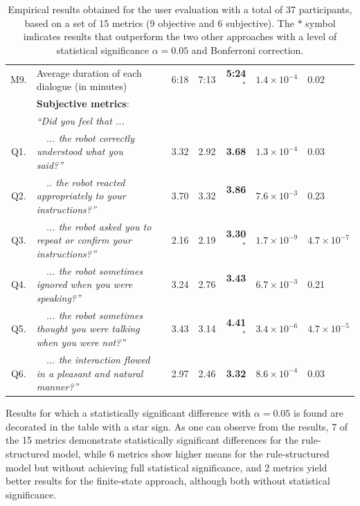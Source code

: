 \begin{table}
\begin{tabular}{|cp{110mm}c|r:r:r|p{16mm}|p{16mm}|}
M9.& Average duration of each dialogue  (in minutes) \vspace{3mm} && 6:18 & 7:13 &\textbf{ 5:24}$^{\mathbf{*}}$ & $1.4\!\times\!10^{-4}$ & 0.02 \\ \hdashline
& \vspace{-2mm} \textbf{Subjective metrics}:  && & & & & \\ 
&\textit{``Did you feel that ...}  && & & & & \\ 
Q1.&\ \ \textit{... the robot correctly understood what you said?''}  && 3.32 & 2.92 &  \textbf{3.68} & $1.3\!\times\!10^{-4}$ & 0.03 \\
Q2.& \ \ \textit{.. the robot reacted appropriately to your instructions?''}   && 3.70 & 3.32 & \textbf{3.86}$^{\phantom{*}}$ & $7.6\!\times\!10^{-3}$ & 0.23 \\
Q3.&\ \ \textit{... the robot asked you to repeat or confirm your instructions?''}   & & 2.16 & 2.19 & \textbf{3.30}$^{\mathbf{*}}$ & $1.7\!\times\!10^{-9}$ & $4.7\!\times\!10^{-7}$ \\
Q4.&\ \ \textit{... the robot sometimes ignored when you were speaking?''}  & & 3.24 & 2.76 & \textbf{3.43}$^{\phantom{*}}$ & $6.7\!\times\!10^{-3}$ & 0.21 \\
Q5.&\ \ \textit{... the robot sometimes thought you were talking when you were not?''}  & & 3.43 & 3.14 & \textbf{4.41}$^{\mathbf{*}}$ & $3.4\!\times\!10^{-6}$ & $4.7\!\times\!10^{-5}$ \\
Q6.&\ \ \textit{... the interaction flowed in a pleasant and natural manner?''} \vspace{3mm}  & & 2.97 & 2.46 & \textbf{3.32} & $8.6\!\times\!10^{-4}$ & 0.03 \\ \hline
\end{tabular} \vspace{3mm}
\caption{Empirical results obtained for the user evaluation with a total of 37 participants, based on a set of 15 metrics (9 objective and 6 subjective). The $\mathbf{*}$ symbol indicates results that outperform the two other approaches with a level of statistical significance $\alpha = 0.05$ and Bonferroni correction. }
\label{table:results_exp3}
\end{table}

Results for which a statistically significant difference with $\alpha = 0.05$  is found are decorated in the table with a star sign. As one can observe from the results, 7 of the 15 metrics demonstrate statistically significant differences for the rule-structured model, while 6 metrics show higher means for the rule-structured model but without achieving full statistical significance, and 2 metrics yield better results for the finite-state approach, although both without statistical significance. 

